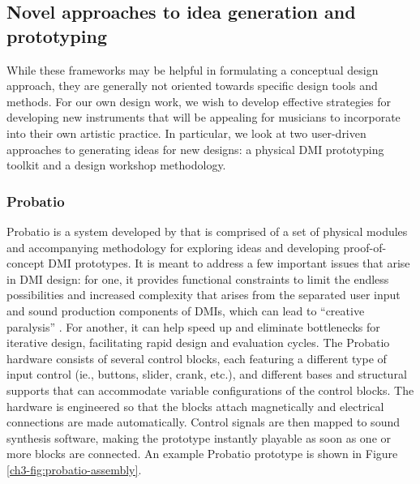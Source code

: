\documentclass[Sullivan_phd_thesis.tex]{subfiles}
\begin{document}
\subsection{Novel approaches to idea generation and prototyping}
\label{ch3-sec:novel-approaches-to-idea-generation-and-prototyping}

While these frameworks may be helpful in formulating a conceptual design approach, they are generally not oriented towards specific design tools and methods. For our own design work, we wish to develop effective strategies for developing new instruments that will be appealing for musicians to incorporate into their own artistic practice. In particular, we look at two user-driven approaches to generating ideas for new designs: a physical DMI prototyping toolkit and a design workshop methodology. 

\subsubsection{Probatio}
\label{ch3-sec:probatio}

Probatio is a system developed by \textcite{Calegario2019} that is comprised of a set of physical modules and accompanying methodology for exploring ideas and developing proof-of-concept DMI prototypes. It is meant to address a few important issues that arise in DMI design: for one, it provides functional constraints to limit the endless possibilities and increased complexity that arises from the separated user input and sound production components of DMIs, which can lead to ``creative paralysis'' \parencite{Magnusson2010}. For another, it can help speed up and eliminate bottlenecks for iterative design, facilitating rapid design and evaluation cycles. The Probatio hardware consists of several control blocks, each featuring a different type of input control (ie., buttons, slider, crank, etc.), and different bases and structural supports that can accommodate variable configurations of the control blocks. The hardware is engineered so that the blocks attach magnetically and electrical connections are made automatically. Control signals are then mapped to sound synthesis software, making the prototype instantly playable as soon as one or more blocks are connected. An example Probatio prototype is shown in Figure \ref{ch3-fig:probatio-assembly}.
\end{document}
